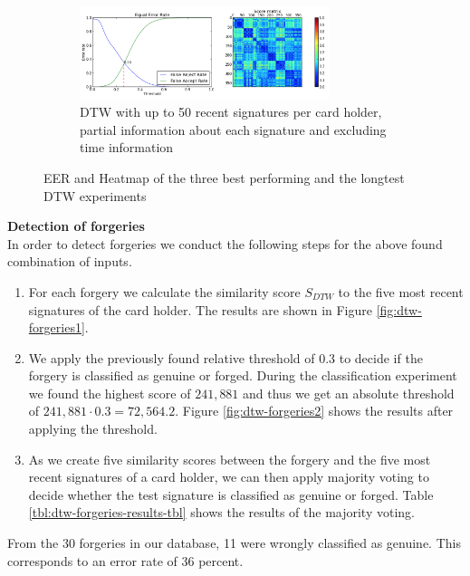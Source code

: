 \documentclass[a4paper, oneside]{csthesis}
\begin{document}
\begin{figure}
        \begin{subfigure}[b]{\textwidth}
                \centering
                \includegraphics[width=0.8\textwidth]{figures/dtw-exp4.png}
                \caption{DTW with up to 50 recent signatures per card holder, partial information about each signature and excluding time information}
                \label{fig:dtw-exp4}
        \end{subfigure}%

        \caption{EER and Heatmap of the three best performing and the longtest DTW experiments}\label{fig:dtw-experiments2}
\end{figure}

\textbf{Detection of forgeries}\\
In order to detect forgeries we conduct the following steps for the above found combination of inputs.

\begin{enumerate}
\item For each forgery we calculate the similarity score $S_{DTW}$ to the five most recent signatures of the card holder. The results are shown in Figure \ref{fig:dtw-forgeries1}.

\item We apply the previously found relative threshold of 0.3 to decide if the forgery is classified as genuine or forged. During the classification experiment we found the highest score of $241,881$ and thus we get an absolute threshold of $241,881 \cdot 0.3 = 72,564.2$. Figure \ref{fig:dtw-forgeries2} shows the results after applying the threshold.

\item As we create five similarity scores between the forgery and the five most recent signatures of a card holder, we can then apply majority voting to decide whether the test signature is classified as genuine or forged. Table \ref{tbl:dtw-forgeries-results-tbl} shows the results of the majority voting.

\end{enumerate}

From the 30 forgeries in our database, 11 were wrongly classified as genuine. This corresponds to an error rate of 36 percent.
\end{document}
